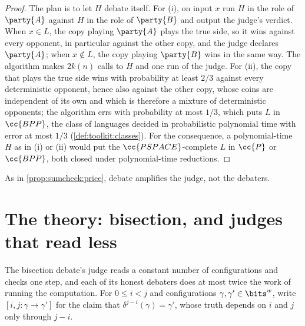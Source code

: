 \begin{refsection}
\begin{proof}
The plan is to let $H$ debate itself. For (i), on input $x$ run $H$ in the role of $\party{A}$ against $H$ in the role of $\party{B}$ and output the judge's verdict. When $x\in L$, the copy playing $\party{A}$ plays the true side, so it wins against every opponent, in particular against the other copy, and the judge declares $\party{A}$; when $x\notin L$, the copy playing $\party{B}$ wins in the same way. The algorithm makes $2k(n)$ calls to $H$ and one run of the judge. For (ii), the copy that plays the true side wins with probability at least $2/3$ against every deterministic opponent, hence also against the other copy, whose coins are independent of its own and which is therefore a mixture of deterministic opponents; the algorithm errs with probability at most $1/3$, which puts $L$ in $\cc{BPP}$, the class of languages decided in probabilistic polynomial time with error at most $1/3$ (\cref{def:toolkit:classes}). For the consequence, a polynomial-time $H$ as in (i) or (ii) would put the $\cc{PSPACE}$-complete $L$ in $\cc{P}$ or $\cc{BPP}$, both closed under polynomial-time reductions.
\end{proof}

As in \cref{prop:sumcheck:price}, debate amplifies the judge, not the debaters.

\section{The theory: bisection, and judges that read less}\label{sec:debate:bisection}

The bisection debate's judge reads a constant number of configurations and checks one step, and each of its honest debaters does at most twice the work of running the computation. For $0\le i<j$ and configurations $\gamma,\gamma'\in\bits^w$, write $[i,j:\gamma\to\gamma']$ for the claim that $\delta^{j-i}(\gamma)=\gamma'$, whose truth depends on $i$ and $j$ only through $j-i$.



\end{refsection}
